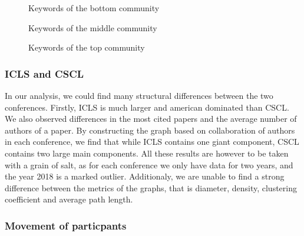 \documentclass[article,twocolumn]{IEEEtran}
\begin{document}
    \begin{figure}
        \begin{center}\end{center}
        \caption{Keywords of the bottom community}
        \label{c1}
    \end{figure}
    

    \begin{figure}
        \begin{center}\end{center}
        \caption{Keywords of the middle community}
        \label{c2}
    \end{figure}
    

    \begin{figure}
        \begin{center}\end{center}
        \caption{Keywords of the top community}
        \label{c3}
    \end{figure}
    
    \hypertarget{icls-and-cscl}{%
\subsubsection{ICLS and CSCL}\label{icls-and-cscl}}

In our analysis, we could find many structural differences between the
two conferences. Firstly, ICLS is much larger and american dominated
than CSCL. We also observed differences in the most cited papers and the
average number of authors of a paper. By constructing the graph based on
collaboration of authors in each conference, we find that while ICLS
contains one giant component, CSCL contains two large main components.
All these results are however to be taken with a grain of salt, as for
each conference we only have data for two years, and the year 2018 is a
marked outlier. Additionaly, we are unable to find a strong difference
between the metrics of the graphs, that is diameter, density, clustering
coefficient and average path length.

    \hypertarget{movement-of-particpants}{%
\subsubsection{Movement of particpants}\label{movement-of-particpants}}
\end{document}
